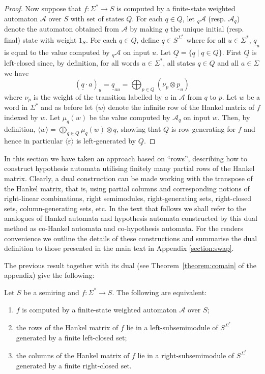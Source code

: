 \documentclass{lmcs}
\numberwithin{theorem}{section}
\begin{document}
\begin{proof}
	Now suppose that $f:\Sigma^* \to S$ is computed by a finite-state weighted automaton $\mathcal{A}$ over $S$ with set of states $Q$. For each $q \in Q$, let $_q\mathcal{A}$ (resp. $\mathcal{A}_q$) denote the automaton obtained from $\mathcal{A}$ by making $q$ the unique initial (resp. final) state with weight $1_S$. For each $q \in Q$, define $\underline{q} \in S^{\Sigma^*}$ where for all $u \in \Sigma^*$, $\underline{q}_u$ is equal to the value computed by $_q\mathcal{A}$ on input $u$. Let $\underline{Q} = \{\underline{q} \mid q\in Q\}$. First $\underline{Q}$ is left-closed since, by definition, for all words $u\in \Sigma^*$, all states $q \in Q$ and all $a\in \Sigma$ we have
 $$(\underline{q} \cdot a)_u = \underline{q}_{au} = \bigoplus_{p \in Q} (\nu_{p} \otimes \underline{p}_u)$$ where $\nu_p$ is the weight of the transition labelled by $a$ in $\mathcal{A}$ from $q$ to $p$.
	Let $w$ be a word in $\Sigma^*$ and as before let $\langle w \rangle$ denote the infinite row of the Hankel matrix of $f$ indexed by $w$. Let $\mu_{q}(w)$ be the value computed by $\mathcal{A}_q$ on input $w$. Then, by definition, $\langle w \rangle = \bigoplus_{q \in Q} \mu_{q}(w) \otimes \underline{q}$, showing that $\underline{Q}$ is row-generating for $f$ and hence in particular $\langle \varepsilon \rangle$ is left-generated by $\underline{Q}$.
\end{proof}


\begin{rem}
	\label{rem:dual}
	In this section we have taken an approach based on ``rows'', describing how to construct hypothesis automata utilising finitely many partial rows of the Hankel matrix. Clearly, a dual construction can be made working with the transpose of the Hankel matrix, that is, using  partial columns and corresponding notions of right-linear combinations, right semimodules, right-generating sets,  right-closed sets, column-generating sets, etc.  In the text that follows we shall refer to the analogues of Hankel automata and hypothesis automata constructed by this dual method as co-Hankel automata and co-hypothesis automata. For the readers convenience we outline the details of these constructions and summarise the dual definition to those presented in the main text in Appendix \ref{section:swap}. 
\end{rem}

The previous result together with its dual (see Theorem~\ref{theorem:comain} of the appendix) give the following:
\begin{cor}
Let $S$ be a semiring and $f: \Sigma^* \rightarrow S$. The following are equivalent:
\begin{enumerate}
	\item  $f$ is computed by a finite-state weighted automaton $\mathcal{A}$ over $S$;
	\item the rows of the Hankel matrix of $f$ lie in a left-subsemimodule of $S^{\Sigma^*}$ generated by a finite left-closed set;
	\item the columns of the Hankel matrix of $f$ lie in a right-subsemimodule of $S^{\Sigma^*}$ generated by a finite right-closed set.
\end{enumerate}
\end{cor}	
\end{document}
